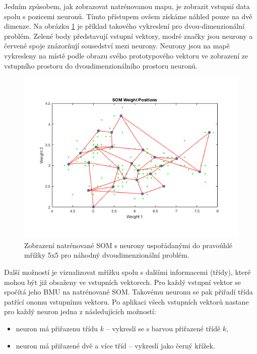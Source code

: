 \documentclass[thesis=M,czech]{FITthesis}[2012/06/26]
\begin{document}
Jedním způsobem, jak zobrazovat natrénovanou mapu, je zobrazit vstupní data spolu s pozicemi neuronů. Tímto přístupem ovšem získáme náhled pouze na dvě dimenze. Na obrázku \ref{fig:plotsompos} je příklad takového vykreslení pro dvou-dimenzionální problém. Zelené body představují vstupní vektory, modré značky jsou neurony a červené spoje znázorňují sousedství mezi neurony. Neurony jsou na mapě vykresleny na místě podle obrazu svého prototypového vektoru ve zobrazení ze vstupního prostoru do dvoudimenzionálního prostoru neuronů.


\begin{figure}[htbp]
\begin{center}
	\includegraphics[scale=0.5]{iris_plotsompos.png}
\caption{Zobrazení natrénované SOM s neurony uspořádanými do pravoúhlé mřížky 5x5 pro náhodný dvoudimenzionální problém.}
\label{fig:plotsompos}
\end{center}
\end{figure}


Další možností je vizualizovat mřížku spolu s dalšími informacemi (třídy), které mohou být již obsaženy ve vstupních vektorech. Pro každý vstupní vektor se spočítá jeho BMU na natrénované SOM. Takovému neuronu se pak přiřadí třída patřící onomu vstupnímu vektoru. Po aplikaci všech vstupních vektorů nastane pro každý neuron jedna z následujících možností:

\begin{itemize}
\item neuron má přiřazenu třídu $k$ -- vykreslí se s barvou přiřazené třídě $k$,
\item  neuron má přiřazené dvě a více tříd -- vykreslí jako černý křížek.
\end{itemize}
 
\end{document}
